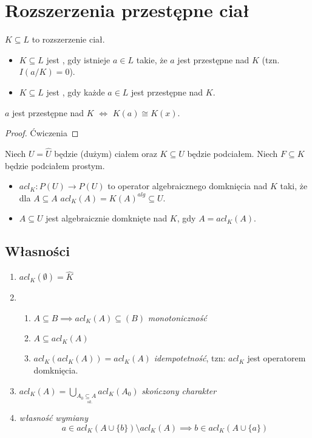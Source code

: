\section{Rozszerzenia przestępne ciał}

$K\subseteq L$ to rozszerzenie ciał.

\begin{bbox}
    \begin{itemize}
        \item[\PHtunny] $K\subseteq L$ jest , gdy istnieje $a\in L$ takie, że $a$ jest przestępne nad $K$ (tzn. $I(a/K)=0$).
        \item[\PHtunny] $K\subseteq L$ jest , gdy każde $a\in L$ jest przestępne nad $K$.
    \end{itemize}
\end{bbox}

\begin{remark}
$a$ jest przestępne nad $K$ $\iff$ $K(a)\cong K(x)$.
\end{remark}
\begin{proof}
Ćwiczenia
\end{proof}

Niech $U=\hat{U}$ będzie (dużym) ciałem oraz $K\subseteq U$ będzie podciałem. Niech $F\subseteq K$ będzie podciałem prostym.
\begin{bbox}
\begin{itemize}
    \item[\PHtunny] $acl_K:P(U)\to P(U)$ to operator algebraicznego domknięcia nad $K$ taki, że dla $A\subseteq A$ $acl_K(A)=K(A)^{alg}\subseteq U$.
    \item[\PHtunny] $A\subseteq U$ jest algebraicznie domknięte nad $K$, gdy $A=acl_K(A)$.
\end{itemize}
\end{bbox}

\subsection{Własności}
\begin{enumerate}
    \item $acl_K(\emptyset)=\hat{K}$
    \item 
        \begin{enumerate}
            \item $A\subseteq B\implies acl_K(A)\subseteq(B)$ \emph{monotoniczność}
            \item $A\subseteq acl_K(A)$
            \item $acl_K(acl_K(A))=acl_K(A)$ \emph{idempotetność}, tzn: $acl_K$ jest operatorem domknięcia.
        \end{enumerate}
    \item $acl_K(A)=\bigcup_{A_0\underset{sk.}{\subseteq A}}acl_K(A_0)$ \emph{skończony charakter}
    \item \emph{własność wymiany}
    $$a\in acl_K(A\cup\{b\})\setminus acl_K(A)\implies b\in acl_K(A\cup \{a\})$$
\end{enumerate}

